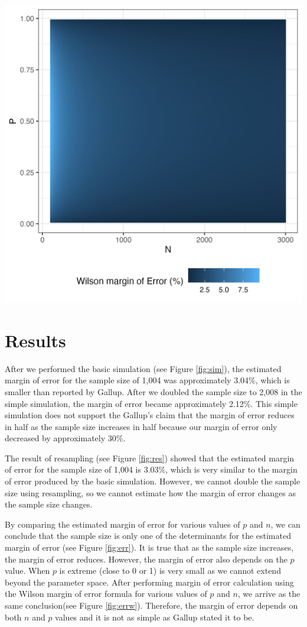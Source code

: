 \documentclass{article}\usepackage[]{graphicx}\usepackage[]{xcolor}
\newenvironment{Figure}
  {\par\medskip\noindent\minipage{\linewidth}}
  {\endminipage\par\medskip}
\begin{document}
\begin{multicols}{2}
\begin{Figure}
 \centering
 \includegraphics[width =0.7\linewidth]{error.wilson.png}
 \label{fig:errw}
\end{Figure}


\section{Results}\label{sec:results}

After we performed the basic simulation (see Figure \ref{fig:sim}), the estimated margin of error for the sample size of 1,004 was approximately 3.04\%, which is smaller than reported by Gallup. After we doubled the sample size to 2,008 in the simple simulation, the margin of error became approximately 2.12\%. This simple simulation does not support the Gallup's claim that the margin of error reduces in half as the sample size increases in half because our margin of error only decreased by approximately 30\%. 

The result of resampling (see Figure \ref{fig:res}) showed that the estimated margin of error for the sample size of 1,004 is 3.03\%, which is very similar to the margin of error produced by the basic simulation. However, we cannot double the sample size using resampling, so we cannot estimate how the margin of error changes as the sample size changes.

By comparing the estimated margin of error for various values of $p$ and $n$, we can conclude that the sample size is only one of the determinants for the estimated margin of error (see Figure \ref{fig:err}). It is true that as the sample size increases, the margin of error reduces. However, the margin of error also depends on the $p$ value. When $p$ is extreme (close to 0 or 1) is very small as we cannot extend beyond the parameter space. After performing margin of error calculation using the Wilson margin of error formula for various values of $p$ and $n$, we arrive as the same conclusion(see Figure \ref{fig:errw}). Therefore, the margin of error depends on both $n$ and $p$ values and it is not as simple as Gallup stated it to be.




\end{multicols}
\end{document}
